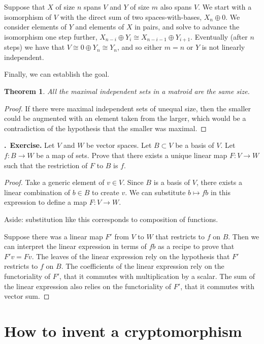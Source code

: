 \documentclass[11pt, noamsfonts]{amsart}
\newcommand{\pointheader}{\vspace{2mm}\noindent\refstepcounter{section}\textbf{\thesection.}}
\newcommand{\bpoint}[1]{\pointheader~{\bf #1.}}
\newtheorem{theorem}{Theorem}
\begin{document}
Suppose that \(X\) of size \(n\) spans \(V\) and \(Y\) of size \(m\) also spans \(V\). We start with a isomorphism of \(V\) with the direct sum of two spaces-with-bases, \(X_n \oplus 0\). We consider elements of \(Y\) and elements of \(X\) in pairs, and solve to advance the isomorphism one step further, \(X_{n-i} \oplus Y_{i} \cong X_{n-i-1} \oplus Y_{i+1}\). Eventually (after \(n\) steps) we have that \(V \cong 0 \oplus Y_{n} \cong Y_{n}\), and so either \(m = n\) or \(Y\) is not linearly independent.

Finally, we can establish the goal.

\begin{theorem}
All the maximal independent sets in a matroid are the same size.
\end{theorem}

\begin{proof}
If there were maximal independent sets of unequal size, then the smaller could be augmented with an element taken from the larger,
which would be a contradiction of the hypothesis that the smaller was maximal.
\end{proof}


\bpoint{Exercise}
Let \(V\) and \(W\) be vector spaces. Let \(B \subset V\) be a basis of \(V\).
Let \(f \colon B \to W\) be a map of sets. Prove that there exists a unique
linear map \(F \colon V \to W\) such that the restriction of \(F\) to \(B\)
is \(f\).

\begin{proof}
Take a generic element of \(v \in V\).
Since \(B\) is a basis of \(V\),
there exists a linear combination
of \(b \in B\) to create \(v\).
We can substitute \(b \mapsto f b\) in this expression to define a map \(F : V \to W\).

Aside: substitution like this corresponds to composition of functions.

Suppose there was a linear map \(F'\) from \(V\) to \(W\) that restricts to \(f\) on \(B\). Then we can interpret the linear expression in terms of \(f b\) as a recipe to prove that \(F' v = F v\).
The leaves of the linear expression rely on the hypothesis that \(F'\) restricts to \(f\) on \(B\). The coefficients of the linear expression
rely on the functoriality of \(F'\), that it commutes with multiplication by a scalar. The sum of the linear expression also  relies on the functoriality of \(F'\), that it commutes with vector sum.
\end{proof}

\section{How to invent a cryptomorphism}
\end{document}
